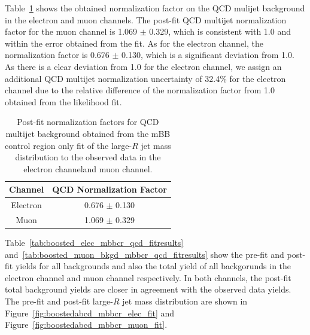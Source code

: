 Table~\ref{tab:boosted_qcdfitstudies_mBBcr_normfact} shows the obtained normalization factor
on the QCD mulijet background in the electron and muon channels. The post-fit QCD multijet normalization factor 
for the muon channel is 1.069 $\pm$ 0.329, which is consistent with 1.0 and within the error obtained
from the fit. As for the electron channel, the normalization factor is 0.676 $\pm$ 0.130, which is a significant
deviation from 1.0. As there is a clear deviation from 1.0 for the electron channel, we assign an additional QCD multijet 
normalization uncertainty of 32.4\% for the electron channel due to the relative difference of the normalization factor from 1.0 
obtained from the likelihood fit.

\begin{table}
\begin{center}
\begin{tabular}{c|c}
Channel  & QCD Normalization Factor  \\      
\hline
Electron &  0.676 $\pm$ 0.130 \\
Muon     &  1.069 $\pm$ 0.329 \\
\end{tabular}
\end{center}
\caption{Post-fit normalization factors for QCD multijet background obtained 
from the mBB control region only fit of the large-$R$ jet mass distribution
to the observed data in the electron channeland muon channel.} 
\label{tab:boosted_qcdfitstudies_mBBcr_normfact}
\end{table}

Table~\ref{tab:boosted_elec_mbbcr_qcd_fitresults} and~\ref{tab:boosted_muon_bkgd_mbbcr_qcd_fitresults} show
the pre-fit and post-fit yields for all backgrounds and also the total yield of all backgorunds in 
the electron channel and muon channel respectively. In both channels, the post-fit total background yields 
are closer in agreement with the observed data yields. The pre-fit and post-fit large-$R$ jet mass distribution 
are shown in Figure~\ref{fig:boostedabcd_mbbcr_elec_fit} and Figure~\ref{fig:boostedabcd_mbbcr_muon_fit}.

